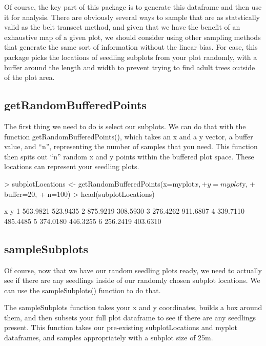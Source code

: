 \documentclass{article}
\begin{document}
Of course, the key part of this package is to generate this dataframe and then use it for analysis. There are obviously several ways to sample that are as statstically valid as the belt transect method, and given that we have the benefit of an exhaustive map of a given plot, we should consider using other sampling methods that generate the same sort of information without the linear bias. For ease, this package picks the locations of seedling subplots from your plot randomly, with a buffer around the length and width to prevent trying to find adult trees outside of the plot area.

\subsection{getRandomBufferedPoints}

The first thing we need to do is select our subplots. We can do that with the function getRandomBufferedPoints(), which takes an x and a y vector, a buffer value, and ``n'', representing the number of samples that you need. This function then spits out ``n'' random x and y points within the buffered plot space. These locations can represent your seedling plots.

\begin{Schunk}
\begin{Sinput}
> subplotLocations <- getRandomBufferedPoints(x=myplot$x,
+                                             y=myplot$y,
+                                             buffer=20,
+                                             n=100)
> head(subplotLocations)
\end{Sinput}
\begin{Soutput}
         x        y
1 563.9821 523.9435
2 875.9219 308.5930
3 276.4262 911.6807
4 339.7110 485.4485
5 374.0180 446.3255
6 256.2419 403.6310
\end{Soutput}
\end{Schunk}

\subsection{sampleSubplots}
Of course, now that we have our random seedling plots ready, we need to actually see if there are any seedlings inside of our randomly chosen subplot locations. We can use the sampleSubplots() function to do that.

The sampleSubplots function takes your x and y coordinates, builds a box around them, and then subsets your full plot dataframe to see if there are any seedlings present. This function takes our pre-existing subplotLocations and myplot dataframes, and samples appropriately with a subplot size of 25m.
\end{document}
